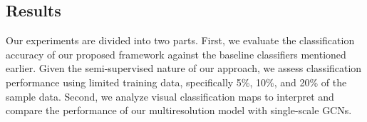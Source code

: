 \subsection{Results} \label{sec:results}

Our experiments are divided into two parts. First, we evaluate the classification accuracy of our proposed framework against the baseline classifiers mentioned earlier. Given the semi-supervised nature of our approach, we assess classification performance using limited training data, specifically 5\%, 10\%, and 20\% of the sample data. Second, we analyze visual classification maps to interpret and compare the performance of our multiresolution model with single-scale GCNs.






